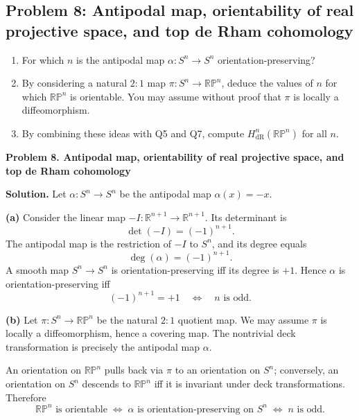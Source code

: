 \documentclass[12pt,a4paper]{article}
\theoremstyle{plain}
\theoremstyle{definition}      %
\begin{document}
	\subsection*{Problem 8: Antipodal map, orientability of real projective space, and top de Rham cohomology}
	\begin{enumerate}
		\item[(a)] For which $n$ is the antipodal map $\alpha: S^n \to S^n$ orientation-preserving?
		\item[(b)] By considering a natural $2:1$ map $\pi: S^n \to \mathbb{RP}^n$, deduce the values of $n$ for which
		$\mathbb{RP}^n$ is orientable. You may assume without proof that $\pi$ is locally a diffeomorphism.
		\item[(c)] By combining these ideas with Q5 and Q7, compute $H^n_{\mathrm{dR}}(\mathbb{RP}^n)$ for all $n$.
	\end{enumerate}
	
	
	\textbf{Problem 8. Antipodal map, orientability of real projective space, and top de Rham cohomology}
	
	\textbf{Solution.}
	Let $\alpha:S^n\to S^n$ be the antipodal map $\alpha(x)=-x$.
	
	\textbf{(a)} Consider the linear map $-I:\mathbb{R}^{n+1}\to\mathbb{R}^{n+1}$. Its determinant is
	\[
	\det(-I)=(-1)^{n+1}.
	\]
	The antipodal map is the restriction of $-I$ to $S^n$, and its degree equals
	\[
	\deg(\alpha)=(-1)^{n+1}.
	\]
	A smooth map $S^n\to S^n$ is orientation-preserving iff its degree is $+1$. Hence $\alpha$ is orientation-preserving iff
	\[
	(-1)^{n+1}=+1 \quad \Longleftrightarrow \quad n \text{ is odd.}
	\]
	
	\textbf{(b)} Let $\pi:S^n\to \mathbb{RP}^n$ be the natural $2:1$ quotient map. We may assume $\pi$ is locally a diffeomorphism, hence a covering map. The nontrivial deck transformation is precisely the antipodal map $\alpha$.
	
	An orientation on $\mathbb{RP}^n$ pulls back via $\pi$ to an orientation on $S^n$; conversely, an orientation on $S^n$ descends to $\mathbb{RP}^n$ iff it is invariant under deck transformations. Therefore
	\[
	\mathbb{RP}^n \text{ is orientable}
	\;\Longleftrightarrow\;
	\alpha \text{ is orientation-preserving on } S^n
	\;\Longleftrightarrow\;
	n \text{ is odd.}
	\]
	
\end{document}
